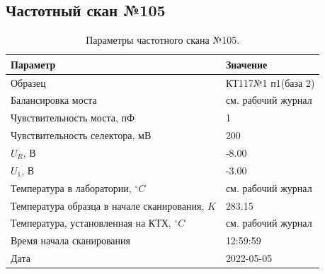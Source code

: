 \subsection{Частотный скан №105}
\begin{table}[!ht]
    \centering
    \caption{Параметры частотного скана №105.}
    \begin{tabular}{|l|l|}
        \hline
        Параметр                                       & Значение                  \\ \hline
        Образец                                        & КТ117№1 п1(база 2)        \\ \hline
        Балансировка моста                             & см. рабочий журнал        \\ \hline
        Чувствительность моста, пФ                     & 1                         \\ \hline
        Чувствительность селектора, мВ                 & 200                       \\ \hline
        $U_R$, В                                       & -8.00                     \\ \hline
        $U_1$, В                                       & -3.00                     \\ \hline
        Температура в лаборатории, $^\circ C$          & см. рабочий журнал        \\ \hline
        Температура образца в начале сканирования, $K$ & 283.15                    \\ \hline
        Температура, установленная на КТХ, $^\circ C$  & см. рабочий журнал        \\ \hline
        Время начала сканирования                      & 12:59:59                  \\ \hline
        Дата                                           & 2022-05-05                \\ \hline
    \end{tabular}
    \label{table:frequency_scan_105}
\end{table}

